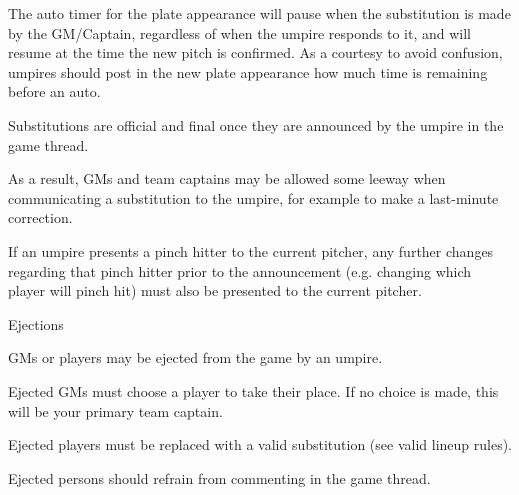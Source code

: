 \begin{deepEnumerate}
\begin{deepEnumerate}
\begin{deepEnumerate}
			\item The auto timer for the plate appearance will pause when the substitution is made by the GM/Captain, 
			regardless of when the umpire responds to it, 
			and will resume at the time the new pitch is confirmed. 
			As a courtesy to avoid confusion, 
			umpires should post in the new plate appearance how much time is remaining before an auto.
		\end{deepEnumerate}
		\item Substitutions are official and final once they are announced by the umpire in the game thread.
		\begin{deepEnumerate}
			\item As a result, GMs and team captains may be allowed some leeway when communicating a substitution to the umpire, 
			for example to make a last-minute correction.
			\item If an umpire presents a pinch hitter to the current pitcher, 
			any further changes regarding that pinch hitter prior to the announcement 
			(e.g. changing which player will pinch hit) 
			must also be presented to the current pitcher.
		\end{deepEnumerate}
	\end{deepEnumerate}
	\item Ejections
	\begin{deepEnumerate}
		\item GMs or players may be ejected from the game by an umpire.
		\begin{deepEnumerate}
			\item Ejected GMs must choose a player to take their place. If no choice is made, this will be your primary team captain.
			\item Ejected players must be replaced with a valid substitution (see valid lineup rules).
			\item Ejected persons should refrain from commenting in the game thread.
		\end{deepEnumerate}
	\end{deepEnumerate}
\end{deepEnumerate}
